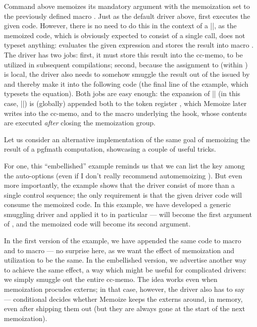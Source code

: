 \documentclass[a4paper,11pt]{article}
\begin{document}
Command  above memoizes its mandatory argument with the memoization
 set to the previously defined macro .
Just as the default driver above,  first executes the
given code.  However, there is no need to do this in the context of a
|\setbox|, as the memoized code, which is obviously expected to consist of a
single  call, does not typeset anything: 
evaluates the given expression and stores the result into macro
.  The driver has two jobs: first, it must store this result
into the cc-memo, to be utilized in subsequent compilations; second, because
the assignment to  (within ) is local, the
driver also needs to somehow smuggle the result out of the  issued
by  and thereby make it into the following code (the final line
of the example, which typesets the equation).  Both jobs are easy enough: the
expansion of |\def\noexpand\pgfmathresult{\pgfmathresult}| (in this case,
|\def\pgfmathresult{42.0}|) is (globally) appended both to the token register
, which Memoize later writes into the cc-memo, and to the
macro underlying the  hook, whose contents are
executed \emph{after} closing the memoization group.

Let us consider an alternative implementation of the same goal of memoizing the
result of a pgfmath computation, showcasing a couple of useful tricks.


For one, this ``embellished'' example reminds us that we can list the
 key among the auto-options (even if I don't really recommend
automemoizing ).  But even more importantly, the example shows
that the driver consist of more than a single control sequence; the only
requirement is that the given driver code will consume the memoized code.  In
this example, we have developed a generic smuggling driver and applied it to
 in particular ---  will become the first
argument of , and the memoized code will become its
second argument.

In the first version of the example, we have appended the same code to macro
 and to macro  --- no
surprise here, as we want the effect of memoization and utilization to be the
same.  In the embellished version, we advertise another way to achieve the same
effect, a way which might be useful for complicated drivers: we simply smuggle
out the entire cc-memo.  The idea works even when memoization procudes externs;
in that case, however, the driver also has to say  ---
conditional  decides whether Memoize keeps the externs
around, in memory, even after shipping them out (but they are always gone at
the start of the next memoization).
\end{document}
